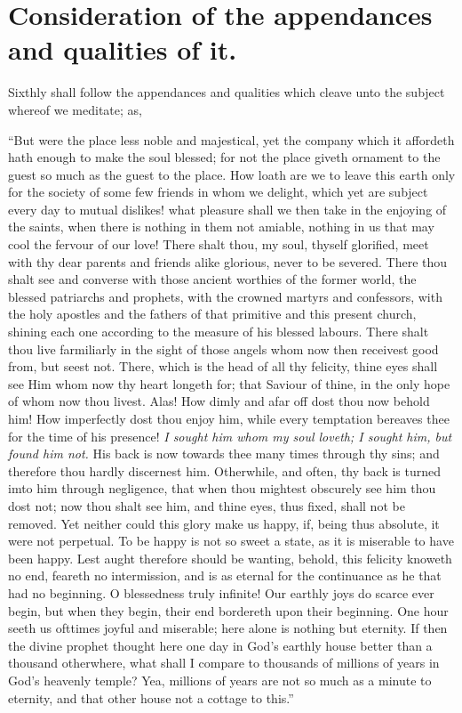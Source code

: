 \section{Consideration of the appendances and qualities of it.}

Sixthly shall follow the appendances and qualities which cleave unto the subject whereof we meditate; as, 

``But were the place less noble and majestical, yet the company which it affordeth hath enough to make the soul blessed; for not the place giveth ornament to the guest so much as the guest to the place. How loath are we to leave this earth only for the society of some few friends in whom we delight, which yet are subject every day to mutual dislikes! what pleasure shall we then take in the enjoying of the saints, when there is nothing in them not amiable, nothing in us that may cool the fervour of our love! There shalt thou, my soul, thyself glorified, meet with thy dear parents and friends alike glorious, never to be severed. There thou shalt see and converse with those ancient worthies of the former world, the blessed patriarchs and prophets, with the crowned martyrs and confessors, with the holy apostles and the fathers of that primitive and this present church, shining each one according to the measure of his blessed labours. There shalt thou live farmiliarly in the sight of those angels whom now then receivest good from, but seest not. There, which is the head of all thy felicity, thine eyes shall see Him whom now thy heart longeth for; that Saviour of thine, in the only hope of whom now thou livest. Alas! How dimly and afar off dost thou now behold him! How imperfectly dost thou enjoy him, while every temptation bereaves thee for the time of his presence! \emph{I sought him whom my soul loveth; I sought him, but found him not.} His back is now towards thee many times through thy sins; and therefore thou hardly discernest him. Otherwhile, and often, thy back is turned imto him through negligence, that when thou mightest obscurely see him thou dost not; now thou shalt see him, and thine eyes, thus fixed, shall not be removed. Yet neither could this glory make us happy, if, being thus absolute, it were not perpetual. To be happy is not so sweet a state, as it is miserable to have been happy. Lest aught therefore should be wanting, behold, this felicity knoweth no end, feareth no intermission, and is as eternal for the continuance as he that had no beginning. O blessedness truly infinite! Our earthly joys do scarce ever begin, but when they begin, their end bordereth upon their beginning. One hour seeth us ofttimes joyful and miserable; here alone is nothing but eternity. If then the divine prophet thought here one day in God's earthly house better than a thousand otherwhere, what shall I compare to thousands of millions of years in God's heavenly temple? Yea, millions of years are not so much as a minute to eternity, and that other house not a cottage to this.''

